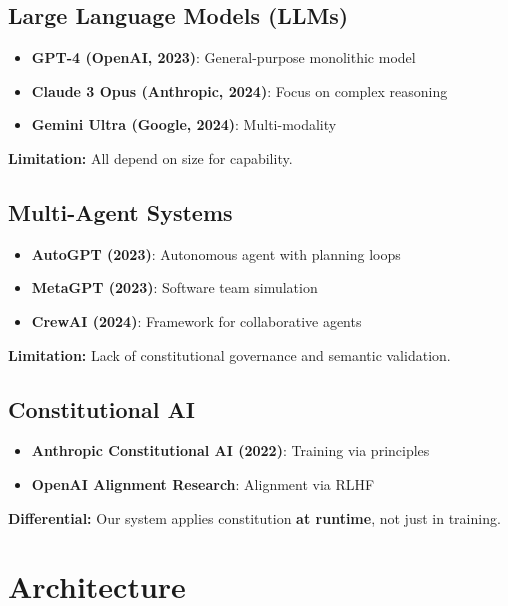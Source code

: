 \documentclass[11pt]{article}
\begin{document}
\subsection{Large Language Models (LLMs)}

\begin{itemize}
    \item \textbf{GPT-4 (OpenAI, 2023)}: General-purpose monolithic model
    \item \textbf{Claude 3 Opus (Anthropic, 2024)}: Focus on complex reasoning
    \item \textbf{Gemini Ultra (Google, 2024)}: Multi-modality
\end{itemize}

\textbf{Limitation:} All depend on size for capability.

\subsection{Multi-Agent Systems}

\begin{itemize}
    \item \textbf{AutoGPT (2023)}: Autonomous agent with planning loops
    \item \textbf{MetaGPT (2023)}: Software team simulation
    \item \textbf{CrewAI (2024)}: Framework for collaborative agents
\end{itemize}

\textbf{Limitation:} Lack of constitutional governance and semantic validation.

\subsection{Constitutional AI}

\begin{itemize}
    \item \textbf{Anthropic Constitutional AI (2022)}: Training via principles
    \item \textbf{OpenAI Alignment Research}: Alignment via RLHF
\end{itemize}

\textbf{Differential:} Our system applies constitution \textbf{at runtime}, not just in training.

\section{Architecture}
\end{document}
